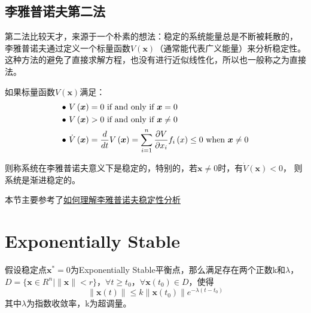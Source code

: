 \documentclass[lang=cn,10pt]{elegantbook}
\newcommand\bv[1]{\boldsymbol{#1}}
\begin{document}
\subsection*{李雅普诺夫第二法}
第二法比较天才，来源于一个朴素的想法：稳定的系统能量总是不断被耗散的，
李雅普诺夫通过定义一个标量函数$V(\bv{x})$（通常能代表广义能量）来分析稳定性。
这种方法的避免了直接求解方程，也没有进行近似线性化，所以也一般称之为直接法。
\begin{theorem}
	如果标量函数$V(\bv{x})$满足：
	\begin{equation*}
		\begin{aligned}
			\bullet ~ & V\left( \boldsymbol{x} \right) =0\,\,\text{if\,\,and\,\,only\,\,if\,\,}\boldsymbol{x}=0                                                                                                    \\
			\bullet ~ & V\left( \boldsymbol{x} \right) >0\,\,\text{if\,\,and\,\,only\,\,if\,\,}\boldsymbol{x}\neq 0                                                                                                \\
			\bullet ~ & \dot{V}\left( \boldsymbol{x} \right) =\frac{d}{dt}V\left( \boldsymbol{x} \right) =\sum_{i=1}^n{\frac{\partial V}{\partial x_i}}f_i\left( x \right) \leq 0~\text{when~}\boldsymbol{x}\neq 0 \\
		\end{aligned}
	\end{equation*}
	\par 则称系统在李雅普诺夫意义下是稳定的，特别的，若$\bv{x} \neq 0$时，有$\dot{V}(\bv{x}) < 0$，
	则系统是渐进稳定的。
\end{theorem}

\par 本节主要参考了\href{https://zhuanlan.zhihu.com/p/58738073}{如何理解李雅普诺夫稳定性分析}

\section{Exponentially Stable}
\begin{definition}
	假设稳定点$\bv{x^{*}} = 0$为Exponentially Stable平衡点，那么满足存在两个正数k和$\lambda$，$D=\{\bv{x}\in R^n|\|\bv{x}\|<r\}$，$\forall t \geq t_0$，$\forall \bv{x}(t_0) \in D$，使得
	\begin{equation}
		\|\bv{x}(t)\|\leq k\|\bv{x}(t_0)\|e^{-\lambda(t-t_0)}
	\end{equation}
	其中$\lambda$为指数收敛率，k为超调量。
\end{definition}
\end{document}
